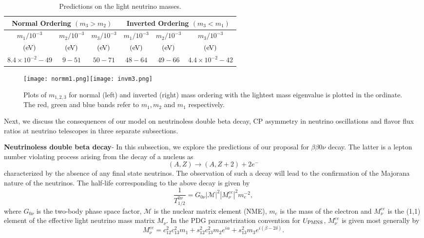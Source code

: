 \documentclass[11pt]{article}
\begin{document}
\begin{table}[H]
\begin{center}
\caption{Predictions on the light neutrino masses.} \label{t3}
 \begin{tabular}{|c|c|c|c|c|c|}
 \hline 
  \multicolumn{3}{|c|}{{Normal Ordering} $(m_3>m_2)$} & \multicolumn{3}{c|}{{Inverted Ordering $(m_3<m_1)$}} \\
\hline 
$m_1/10^{-3}$&$m_2/10^{-3}$ &$m_3/10^{-3}$ &$ m_1/10^{-3}$&$m_2/10^{-3}$&$m_3/10^{-3}$ \\
$\rm (eV)$&$ \rm (eV)$ &$\rm (eV)$ &$\rm (eV)$&$ \rm (eV)$&$\rm (eV)$\\
\hline
$8.4\times 10^{-2}-49$&$9-51$&$50-71$&$48-64$&$49-66$&$4.4\times 10^{-2}-42$\\
\hline
\end{tabular}  
\end{center} 
\end{table}
\noindent


\begin{figure}[H]
\begin{center}
\texttt{[image: normm1.png]}\texttt{[image: invm3.png]}
\caption{Plots of $m_{1,2,3}$ for normal (left) and inverted (right) mass ordering with the lightest mass eigenvalue is plotted in the ordinate. The red, green and blue bands refer to $m_1,m_2$ and $m_1$ respectively.}\label{fg6}
\end{center}
\end{figure}

Next, we discuss the consequences of our model on neutrinoless double beta decay, CP asymmetry in neutrino oscillations and flavor flux ratios at neutrino telescopes in three separate subsections.

\textbf{Neutrinoless double beta decay}- In this subsection, we explore the predictions of our proposal for $\beta\beta 0\nu$ decay. The latter is a lepton number violating process arising from the decay of a nucleus as\begin{equation}(A,Z)\longrightarrow (A, Z+2)+2e^-\end{equation} characterized by the absence of any final state neutrinos. The observation of such a decay will lead to the confirmation of the Majorana nature of the neutrinos. The half-life\cite{Rodejohann:2011mu} corresponding to the above decay is given by
\begin{equation}
\frac{1}{T^{0\nu}_{1/2}}=G_{0\nu}|\mathcal{M}|^2 |M_\nu^{ee}|^2m_e^{-2}, 
\end{equation}
where $G_{0\nu}$ is the two-body phase space factor, $\mathcal{M}$ is the nuclear matrix element (NME), $m_e$ is the mass of the electron and  $M_\nu^{ee}$ is the (1,1) element of the effective light neutrino mass matrix $M_\nu$. In the PDG parametrization convention for $U_{\rm PMNS}$, $M^{ee}_\nu$ is given most generally by
\begin{equation}
M^{ee}_\nu=c_{12}^2c_{13}^2m_1+s_{12}^2c_{13}^2m_2e^{i\alpha}+
s_{13}^2m_3e^{i(\beta-2\delta)}.\label{alps}
\end{equation}
\noindent 
\end{document}
